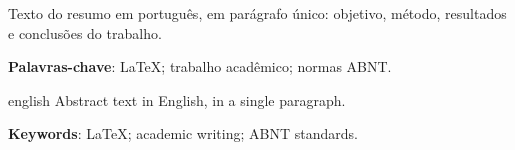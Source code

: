 \begin{resumo}
Texto do resumo em português, em parágrafo único: objetivo, método,
resultados e conclusões do trabalho.

\textbf{Palavras-chave}: LaTeX; trabalho acadêmico; normas ABNT.
\end{resumo}

\begin{resumo}[Abstract]
\begin{otherlanguage*}{english}
Abstract text in English, in a single paragraph.

\textbf{Keywords}: LaTeX; academic writing; ABNT standards.
\end{otherlanguage*}
\end{resumo}
